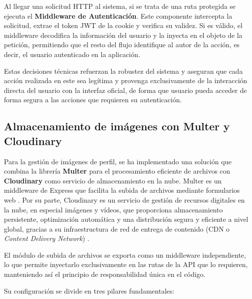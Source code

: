 Al llegar una solicitud HTTP al sistema, si se trata de una ruta protegida se ejecuta el \textbf{Middleware de Autenticación}. Este componente intercepta la solicitud, extrae el token JWT de la cookie y verifica su validez. Si es válido, el middleware decodifica la información del usuario y la inyecta en el objeto de la petición, permitiendo que el resto del flujo identifique al autor de la acción, es decir, el usuario autenticado en la aplicación.

Estas decisiones técnicas refuerzan la robustez del sistema y aseguran que cada acción realizada en este sea legítima y provenga exclusivamente de la interacción directa del usuario con la interfaz oficial, de forma que usuario pueda acceder de forma segura a las acciones que requieren su autenticación.

\subsection{Almacenamiento de imágenes con Multer y Cloudinary}

Para la gestión de imágenes de perfil, se ha implementado una solución que combina la librería \textbf{Multer} para el procesamiento eficiente de archivos con \textbf{Cloudinary} como servicio de almacenamiento en la nube. Multer es un middleware de Express que facilita la subida de archivos mediante formularios web \cite{llamas_multer_nd}. Por su parte, Cloudinary es un servicio de gestión de recursos digitales en la nube, en especial imágenes y vídeos, que proporciona almacenamiento persistente, optimización automática y una distribución segura y eficiente a nivel global, gracias a su infraestructura de red de entrega de contenido (CDN o \textit{Content Delivery Network}) \cite{cloudinary_official_2026,moge_cloudinary_2026,cloudflare_cdn_2026}.


El módulo de subida de archivos se exporta como un middleware independiente, lo que permite inyectarlo exclusivamente en las rutas de la API que lo requieren, manteniendo así el principio de responsabilidad única en el código.

Su configuración se divide en tres pilares fundamentales:

